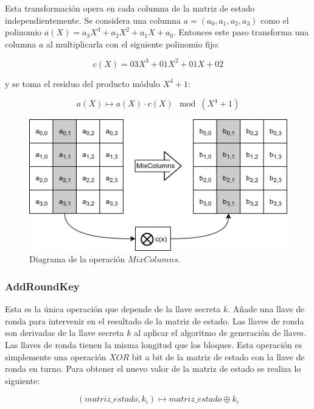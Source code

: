 Esta transformación opera en cada columna de la matriz de estado
independientemente. Se considera una columna $a = (a_0, a_1, a_2, a_3)$
como el polinomio $a(X) = a_3X^3 + a_2X^2 + a_1X + a_0$.
Entonces este paso transforma una columna $a$ al multiplicarla con el
siguiente polinomio fijo:

\begin{equation}
  \label{cifrado_aes_poli}
  c(X) = 03X^3 + 01X^2 + 01X+ 02
\end{equation}

y se toma el residuo del producto módulo $X^4+1$:

\begin{equation}
  \label{cifrado_aes_mix}
  a(X) \mapsto a(X) \cdotp c(X) \mod (X^4+1)
\end{equation}

\begin{figure}[H]
  \begin{center}
    \includegraphics[width=0.6\linewidth]{diagramas/mixColumns}
    \caption{Diagrama de la operación $MixColumns$.}
   \end{center}
\end{figure}


\subsubsection{AddRoundKey}

Esta es la única operación que depende de la llave secreta $k$. Añade una
llave de ronda para intervenir en el resultado de la matriz de estado.
Las llaves de ronda son derivadas de la llave secreta $k$ al aplicar el
algoritmo de generación de llaves. Las llaves de ronda tienen la misma
longitud que los bloques. Esta operación es simplemente una operación
$XOR$ bit a bit de la matriz de estado con la llave de ronda en turno.
Para obtener el nuevo valor de la matriz de estado se realiza lo
siguiente:

\begin{equation}
  \label{cifrado_aes_addkey}
  (matriz\_estado, k_i) \mapsto matriz\_estado \oplus k_i
\end{equation}

